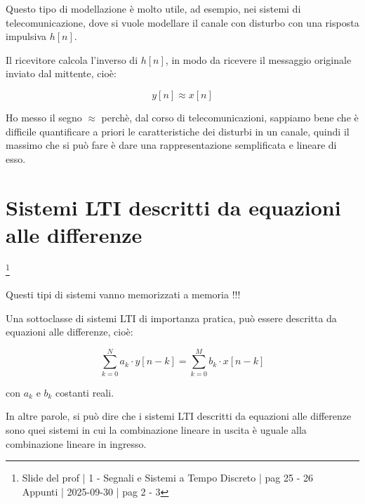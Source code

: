 \begin{tcolorbox}
    Questo tipo di modellazione è molto utile, ad esempio, nei sistemi di telecomunicazione, 
    dove si vuole modellare il canale con disturbo con una risposta impulsiva $h \left[n\right]$. \newline 

    Il ricevitore calcola l'inverso di $h \left[ n\right]$, in modo da ricevere il messaggio originale inviato dal mittente, 
    cioè: 

    {
        \Large 
        \begin{equation}
            y \left[ n \right] \approx x \left[ n\right]
        \end{equation}
    }

    Ho messo il segno $\approx$ perchè, dal corso di telecomunicazioni, sappiamo bene che è difficile quantificare a priori le caratteristiche dei disturbi in un canale, 
    quindi il massimo che si può fare è dare una rappresentazione semplificata e lineare di esso. 
\end{tcolorbox}

\newpage 

\section{Sistemi LTI descritti da equazioni alle differenze}

\footnote{ 
    Slide del prof | 1 - Segnali e Sistemi a Tempo Discreto | pag 25 - 26\\
    Appunti | 2025-09-30 | pag 2 - 3
}
\begin{tcolorbox}
Questi tipi di sistemi vanno memorizzati a memoria !!!    
\end{tcolorbox}

Una sottoclasse di sistemi LTI di importanza pratica, 
può essere descritta da equazioni alle differenze, cioè: 

{
    \Large 
    \begin{equation}
        \sum_{k = 0}^{N}
        a_k \cdot y [n - k]
        =
        \sum_{k = 0}^{M}
        b_k \cdot x [n - k] 
    \end{equation}
} 

con $a_k$ e $b_k$ costanti reali. \newline 

In altre parole, si può dire che i sistemi LTI descritti da equazioni alle differenze 
sono quei sistemi in cui la combinazione lineare in uscita è uguale alla combinazione lineare in ingresso. \newline 

